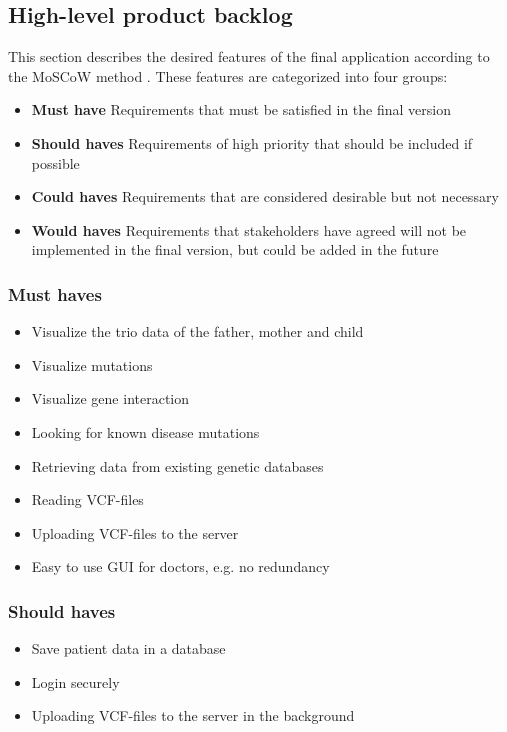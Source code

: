 \subsection{High-level product backlog}
	This section describes the desired features of the final application according to the MoSCoW method \cite{brennan2009guide}. These features are categorized into four groups:
	
	\begin{itemize}
		\item \textbf{Must have} 
			\subitem Requirements that must be satisfied in the final version
		\item \textbf{Should haves} 
			\subitem Requirements of high priority that should be included if possible
		\item \textbf{Could haves} 
			\subitem Requirements that are considered desirable but not necessary
		\item \textbf{Would haves} 
			\subitem Requirements that stakeholders have agreed will not be implemented in the final version, but could be added in the future
	\end{itemize}
	
	\subsubsection{Must haves}
		\begin{itemize}
			\item Visualize the trio data of the father, mother and child
			\item Visualize mutations
			\item Visualize gene interaction
			\item Looking for known disease mutations
			\item Retrieving data from existing genetic databases
			\item Reading VCF-files
			\item Uploading VCF-files to the server
			\item Easy to use GUI for doctors, e.g. no redundancy
		\end{itemize}
	
	\subsubsection{Should haves}
		\begin{itemize}
			\item Save patient data in a database
			\item Login securely
			\item Uploading VCF-files to the server in the background
		\end{itemize}
	
